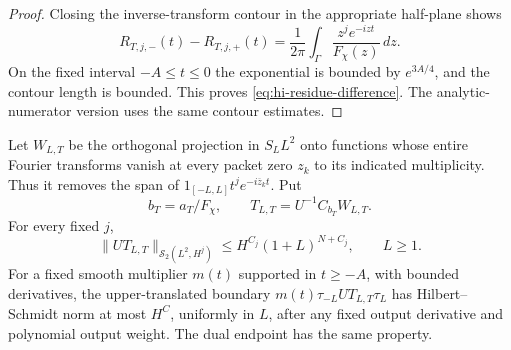 \begin{proof}
Closing the inverse-transform contour in the appropriate half-plane
shows
\[
 R_{T,j,-}(t)-R_{T,j,+}(t)
    =\frac1{2\pi}\int_\Gamma
                    \frac{z^j e^{-izt}}{F_\chi(z)}\,dz.
\]
On the fixed interval $-A\le t\le0$ the exponential is bounded by
$e^{3A/4}$, and the contour length is bounded. This proves
\eqref{eq:hi-residue-difference}. The analytic-numerator version uses
the same contour estimates.
\end{proof}

\begin{lemma}\label{lem:hi-allpole-boundaries}
Let $W_{L,T}$ be the orthogonal projection in $S_LL^2$ onto functions
whose entire Fourier transforms vanish at every packet zero $z_k$ to
its indicated multiplicity. Thus it removes the span of
$1_{[-L,L]}t^j e^{-i\overline z_k t}$. Put
\[
 b_T=a_T/F_\chi,
 \qquad T_{L,T}=U^{-1}C_{b_T}W_{L,T}.
\]
For every fixed $j$,
\begin{equation}\label{eq:hi-allpole-bulk}
 \|UT_{L,T}\|_{\mathcal S_2(L^2,H^j)}
             \le H^{C_j}(1+L)^{N+C_j},\qquad L\ge1.
\end{equation}
For a fixed smooth multiplier $m(t)$ supported in $t\ge-A$, with
bounded derivatives, the upper-translated boundary
$m(t)\tau_{-L}UT_{L,T}\tau_L$ has Hilbert--Schmidt norm at most
$H^C$, uniformly in $L$, after any fixed output derivative and polynomial
output weight. The dual endpoint has the same property.
\end{lemma}
